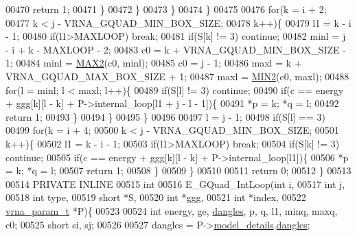 \begin{DoxyCode}
00470           \textcolor{keywordflow}{return} 1;
00471         \}
00472       \}
00473     \}
00474   \}
00475 
00476   \textcolor{keywordflow}{for}(k = i + 2;
00477       k < j - VRNA\_GQUAD\_MIN\_BOX\_SIZE;
00478       k++)\{
00479     l1    = k - i - 1;
00480     \textcolor{keywordflow}{if}(l1>MAXLOOP) \textcolor{keywordflow}{break};
00481     \textcolor{keywordflow}{if}(S[k] != 3) \textcolor{keywordflow}{continue};
00482     minl  = j - i + k - MAXLOOP - 2;
00483     c0    = k + VRNA\_GQUAD\_MIN\_BOX\_SIZE - 1;
00484     minl  = \hyperlink{group__utils_gadd91367918fadbc8d585940d6206d6d2}{MAX2}(c0, minl);
00485     c0    = j - 1;
00486     maxl  = k + VRNA\_GQUAD\_MAX\_BOX\_SIZE + 1;
00487     maxl  = \hyperlink{group__utils_ga2dd4a927a7f937f43a90c144d79107d8}{MIN2}(c0, maxl);
00488     \textcolor{keywordflow}{for}(l = minl; l < maxl; l++)\{
00489       \textcolor{keywordflow}{if}(S[l] != 3) \textcolor{keywordflow}{continue};
00490       \textcolor{keywordflow}{if}(c == energy + ggg[k][l - k] + P->internal\_loop[l1 + j - l - 1])\{
00491         *p = k; *q = l;
00492         \textcolor{keywordflow}{return} 1;
00493       \}
00494     \}
00495   \}
00496 
00497   l = j - 1;
00498   \textcolor{keywordflow}{if}(S[l] == 3)
00499     \textcolor{keywordflow}{for}(k = i + 4;
00500         k < j - VRNA\_GQUAD\_MIN\_BOX\_SIZE;
00501         k++)\{
00502       l1    = k - i - 1;
00503       \textcolor{keywordflow}{if}(l1>MAXLOOP) \textcolor{keywordflow}{break};
00504       \textcolor{keywordflow}{if}(S[k] != 3) \textcolor{keywordflow}{continue};
00505       \textcolor{keywordflow}{if}(c == energy + ggg[k][l - k] + P->internal\_loop[l1])\{
00506         *p = k; *q = l;
00507         \textcolor{keywordflow}{return} 1;
00508       \}
00509     \}
00510 
00511   \textcolor{keywordflow}{return} 0;
00512 \}
00513 
00514 PRIVATE INLINE
00515 \textcolor{keywordtype}{int}
00516 E\_GQuad\_IntLoop(\textcolor{keywordtype}{int} i,
00517                 \textcolor{keywordtype}{int} j,
00518                 \textcolor{keywordtype}{int} type,
00519                 \textcolor{keywordtype}{short} *S,
00520                 \textcolor{keywordtype}{int} *ggg,
00521                 \textcolor{keywordtype}{int} *index,
00522                 \hyperlink{group__energy__parameters_structvrna__param__s}{vrna\_param\_t} *P)\{
00523 
00524   \textcolor{keywordtype}{int} energy, ge, \hyperlink{group__model__details_ga72b511ed1201f7e23ec437e468790d74}{dangles}, p, q, l1, minq, maxq, c0;
00525   \textcolor{keywordtype}{short} si, sj;
00526 
00527   dangles = P->\hyperlink{group__energy__parameters_a7b84353eb9075c595bad4ceb871bcae7}{model\_details}.\hyperlink{group__model__details_adcda4ff2ea77748ae0e8700288282efc}{dangles};

\end{DoxyCode}
